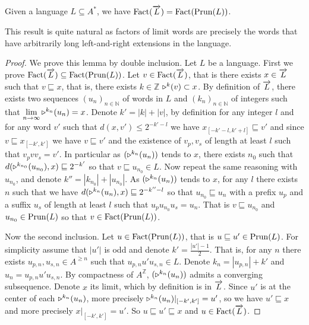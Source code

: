 \begin{lemma}
	Given a language $L\subseteq A^*$, we have $\mathrm{Fact}(\overrightarrow{L}) = \mathrm{Fact}(\mathrm{Prun}(L))$.
	\label{lemma:fact-prun}
\end{lemma}
This result is quite natural as factors of limit words are precisely the words that have arbitrarily long left-and-right extensions in the language.
\begin{proof}
	We prove this lemma by double inclusion. Let $L$ be a language.
	First we prove $\mathrm{Fact}(\overrightarrow{L})\subseteq \mathrm{Fact}(\mathrm{Prun}(L))$.
	Let $v \in \mathrm{Fact}(\overrightarrow{L})$, that is there exists $x \in \overrightarrow{L}$ such that $v\sqsubseteq x$, that is, there exists $k\in \mathbb{Z}$ $\shift{k}{}(v)\subset x$.
	By definition of $\overrightarrow{L}$, there exists two sequences $(u_n)_{n\in\mathbb{N}}$ of words in $L$ and $(k_n)_{n\in\mathbb{N}}$ of integers such that $\lim\limits_{n\to \infty} \shift{k_n}{}(u_n) = x$.
	Denote $k' = |k| + |v|$, by definition for any integer $l$ and for any word $v'$ such that $d(x,v')\leq 2^{-k'-l}$ we have $x_{[-k'-l,k'+l]} \sqsubseteq v'$ and since $v\sqsubseteq x_{[-k',k']}$ we have $v \sqsubseteq v'$ and the existence of $v_p, v_s$ of length at least $l$ such that $v_p v v_s =v'$.
	In particular as  $(\shift{k_n}{}(u_n))$ tends to $x$, there exists $n_0$ such that
	$d(\shift{k_{n_0}}{}(u_{n_0}),x)\sqsubseteq 2^{-k'}$ so that $v\sqsubseteq u_{n_0} \in L$.
	Now repeat the same reasoning with $u_{n_0}$, and denote $k'' = |k_{n_0}| + |u_{n_0}|$.
	As $(\shift{k_n}{}(u_n))$ tends to $x$, for any $l$ there exists $n$ such that we have $d(\shift{k_n}{}(u_n),x)\sqsubseteq 2^{-k''-l}$ so that $u_{n_0}\sqsubseteq u_n$ with a prefix $u_p$ and a suffix $u_s$ of length at least $l$ such that $u_p u_{n_0} u_s = u_n$.
	That is $v\sqsubseteq u_{n_0}$ and $u_{n_0} \in\mathrm{Prun}(L)$ so that $v\in \mathrm{Fact}(\mathrm{Prun}(L))$.
	
	Now the second inclusion.
	Let $u\in \mathrm{Fact}(\mathrm{Prun}(L))$, that is $u\sqsubseteq u' \in \mathrm{Prun}(L)$.
	For simplicity assume that $|u'|$ is odd and denote $k' = \frac{|u'|-1}{2}$.
	That is, for any $n$ there exists $u_{p,n},u_{s,n} \in A^{\geq n}$ such that $u_{p,n}u'u_{s,n} \in L$.
	Denote $k_n = |u_{p,n}| + k'$ and $u_n = u_{p,n} u' u_{s,n}$.
	By compactness of $A^{\mathbb{Z}}$, $(\shift{k_n}{}(u_n))$ admits a converging subsequence. Denote $x$ its limit, which by definition is in $\overrightarrow{L}$.
	Since $u'$ is at the center of each $\shift{k_n}{}(u_n)$, more precisely $\shift{k_n}{}(u_n)|_{[-k', k']}=u'$, so we have $u'\sqsubseteq x$ and more precisely $x|_{[-k',k']}=u'$. So $u\sqsubseteq u' \sqsubseteq x$ and $u \in \mathrm{Fact}(\overrightarrow{L})$.
\end{proof}

